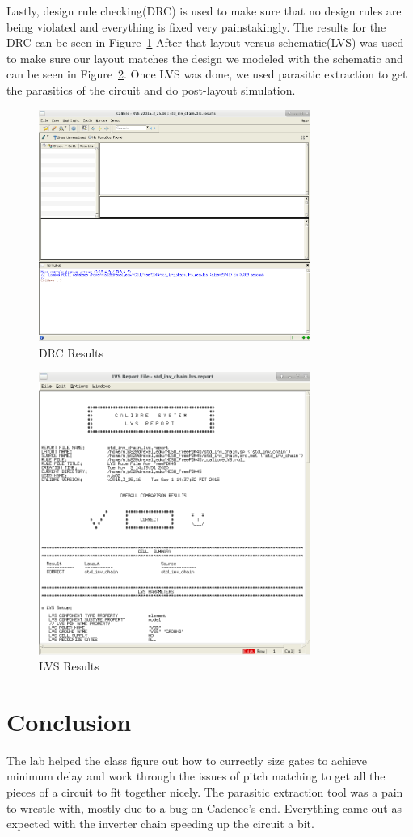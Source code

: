 \documentclass[12pt]{article}
\begin{document}
Lastly, design rule checking(DRC) is used to make sure that no design rules are being violated and everything is fixed very painstakingly.
The results for the DRC can be seen in Figure~\ref{fig:drc}  After that layout versus schematic(LVS) was used to make sure our layout matches
the design we modeled with the schematic and can be seen in Figure~\ref{fig:lvs}. Once LVS was done, we used parasitic extraction to get
the parasitics of the circuit and do post-layout simulation.
\begin{figure}[!htb]
    \centering
    \includegraphics[width=3.5in]{figures/drc.png}
    \caption{DRC Results}\label{fig:drc}
\end{figure}
\begin{figure}[!htb]
    \centering
    \includegraphics[width=3.5in]{figures/lvs.png}
    \caption{LVS Results}\label{fig:lvs}
\end{figure}
\clearpage
\section{Conclusion}
The lab helped the class figure out how to currectly size gates to achieve minimum delay and work through the issues of pitch matching
to get all the pieces of a circuit to fit together nicely. The parasitic extraction tool was a pain to wrestle with, mostly due to a
bug on Cadence's end. Everything came out as expected with the inverter chain speeding up the circuit a bit.
\end{document}
